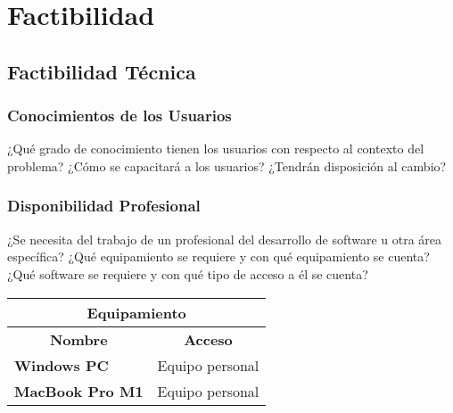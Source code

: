 \chapter{Factibilidad}

\section{Factibilidad Técnica}
\subsection{Conocimientos de los Usuarios}
¿Qué grado de conocimiento tienen los usuarios con respecto al contexto del problema? ¿Cómo se capacitará a los usuarios? ¿Tendrán disposición al cambio?

\subsection{Disponibilidad Profesional}
¿Se necesita del trabajo de un profesional del desarrollo de software u otra área específica? ¿Qué equipamiento se requiere y con qué equipamiento se cuenta? ¿Qué software se requiere y con qué tipo de acceso a él se cuenta?

\begin{center}
	\begin{tabular}{ | l | p{10cm} |}
		\hline
		\multicolumn{2}{|c|}{\textbf{Equipamiento}} \\
		\hline
		\multicolumn{1}{|c|}{\textbf{Nombre}} & \multicolumn{1}{|c|}{\textbf{Acceso}} \\
		\hline
		{\textbf{Windows PC}} & Equipo personal \\ \hline
		
		{\textbf{MacBook Pro M1}} & Equipo personal \\ \hline
	\end{tabular}
  \label{table:physical-equipment}
\end{center}

